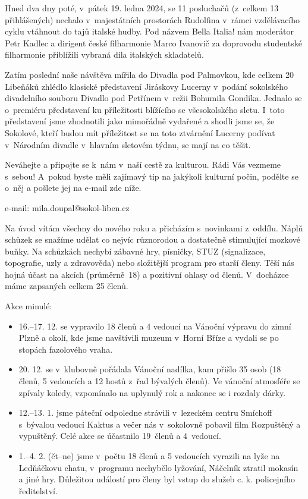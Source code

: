 \documentclass[11pt]{article}
\begin{document}
Hned dva dny poté, v~pátek 19. ledna 2024, se 11 posluchačů (z~celkem 13 přihlášených) nechalo v~majestátních prostorách Rudolfina v~rámci vzdělávacího cyklu vtáhnout do tajů italské hudby. Pod názvem \luv{}Bella Italia!\ruv{} nám moderátor Petr Kadlec a dirigent české filharmonie Marco Ivanovič za doprovodu studentské filharmonie přiblížili vybraná díla italských skladatelů.

Zatím poslední naše návštěva mířila do Divadla pod Palmovkou, kde celkem 20 \luv{}Libeňáků\ruv{} zhlédlo klasické představení Jiráskovy Lucerny v~podání sokolského divadelního souboru \luv{}Divadlo pod Petřínem\ruv{} v~režii Bohumila Gondíka. Jednalo se o~premiéru představení ku příležitosti blížícího se všesokolského sletu. I~toto představení jsme zhodnotili jako mimořádně vydařené a shodli jsme se, že Sokolové, kteří budou mít příležitost se na toto ztvárnění Lucerny podívat v~Národním divadle v~hlavním sletovém týdnu, se mají na co těšit.

Neváhejte a připojte se k~nám v~naší cestě za kulturou. Rádi Vás vezmeme s~sebou! A~pokud byste měli zajímavý tip na jakýkoli kulturní počin, podělte se o~něj a pošlete jej na e-mail zde níže.

\signature{Miloslav Doupal}{e-mail: mila.doupal@sokol-liben.cz}


\vspace*{24pt}

Na úvod vítám všechny do nového roku a přicházím s~novinkami z~oddílu. Náplň schůzek se snažíme udělat co nejvíc různorodou a dostatečně stimulující mozkové buňky. Na schůzkách nechybí zábavné hry, písničky, STUZ (signalizace, topografie, uzly a zdravověda) nebo složitější program pro starší členy. Těší nás hojná účast na akcích (průměrně~18) a pozitivní ohlasy od členů. V~docházce máme zapsaných celkem 25 členů.

\vspace*{12pt}\noindent
Akce minulé:
\begin{itemize}[
  itemsep=-3pt,
  leftmargin=2em,
  itemindent=-1em
]
  \item[] 16.–17. 12. se vypravilo 18 členů a 4 vedoucí na Vánoční výpravu do zimní Plzně a okolí, kde jsme navštívili muzeum v~Horní Bříze a vydali se po stopách fazolového vraha.
  \item[] 20. 12. se v~klubovně pořádala Vánoční nadílka, kam přišlo 35 osob (18 členů, 5 vedoucích a 12 hostů z~řad bývalých členů). Ve vánoční atmosféře se zpívaly koledy, vzpomínalo na uplynulý rok a nakonec se i rozdaly dárky.
  \item[] 12.–13. 1. jsme páteční odpoledne strávili v~lezeckém centru Smíchoff s~bývalou vedoucí Kaktus a večer nás v~sokolovně pobavil film Rozpuštěný a vypuštěný. Celé akce se účastnilo 19~členů a 4~vedoucí.
  \item[] 1.–4. 2. (čt–ne) jsme v~počtu 18 členů a 5 vedoucích vyrazili na lyže na Ledňáčkovu chatu, v~programu nechybělo lyžování, Náčelník ztratil mokasín a jiné hry. Důležitou událostí pro členy byl vstup do služeb c. k. policejního ředitelství.
\end{itemize}
\end{document}
